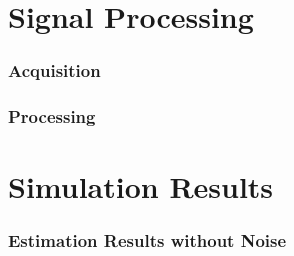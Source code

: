 \documentclass[student,noshadow]{ITRslides}
\begin{document}
\section{Signal Processing}
\begin{frame}
	\frametitle{Acquisition}
\end{frame}

\begin{frame}
	\frametitle{Processing}
\end{frame}

\section{Simulation Results}
\begin{frame}
	\frametitle{Estimation Results without Noise}
	

\end{frame}
\end{document}
